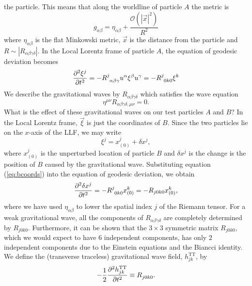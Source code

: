 the particle\cite{MTW73}. This means that along the worldline of particle $A$
the metric is
\begin{equation}
g_{\alpha\beta} = \eta_{\alpha\beta} + \frac{\mathcal{O}\left(|\vec{x}|^2\right)}{R^2}
\end{equation}
where $\eta_{\alpha\beta}$ is the flat Minkowski metric, $\vec{x}$ is the
distance from the particle and $R \sim |R_{\alpha\beta\gamma\delta}|$. In the
Local Lorentz frame of particle $A$, the equation of geodesic deviation
becomes
\begin{equation}
\frac{\partial^2 \xi^{j}}{\partial t^2} = -
\tensor{R}{^j_{\alpha\beta\gamma}}u^\alpha\xi^\beta u^\gamma =
-\tensor{R}{^j_{0k0}} \xi^k
\end{equation}
We describe the gravitational waves by $R_{\alpha\beta\gamma\delta}$ which
satisfies the wave equation
\begin{equation}
\eta^{\mu\nu}R_{\alpha\beta\gamma\delta,\mu\nu} = 0.
\end{equation}
What is the effect of these gravitational waves on our test particles $A$ and
$B$? In the Local Lorentz frame, $\vec{\xi}$ is just the coordinates of $B$.
Since the two particles lie on the $x$-axis of the LLF, we may write
\begin{equation}
\label{eq:bcoords}
\xi^j = x_{(0)}^j + \delta x^j,
\end{equation}
where $x_{(0)}^j$ is the unperturbed location of particle $B$ and $\delta x^j$
is the change is the position of $B$ caused by the gravitational wave.
Substituting equation (\ref{eq:bcoords}) into the equation of geodesic
deviation, we obtain
\begin{equation}
\label{eq:particledev}
\frac{\partial^2 \delta x^j}{\partial t^2} = - \tensor{R}{^j_{0k0}} x_{(0)}^k =
-R_{j0k0} x_{(0)}^k,
\end{equation}
where we have used $\eta_{\alpha\beta}$ to lower the spatial index $j$ of the
Riemann tensor. For a weak gravitational wave, all the components of
$R_{\alpha\beta\gamma\delta}$ are completely determined by $R_{j0k0}$.
Furthermore, it can be shown that the $3\times3$ symmetric matrix $R_{j0k0}$,
which we would expect to have $6$ independent components, has only $2$
independent components due to the Einstein equations and the Biancci identity.
We define the (transverse traceless) gravitational wave field,
$h_{jk}^\mathrm{TT}$, by
\begin{equation}
-\frac{1}{2} \frac{\partial^2 h_{jk}^\mathrm{TT}}{\partial t^2} \equiv
\tensor{R}{_{j0k0}}.
\label{eq:hjkdef}
\end{equation}
